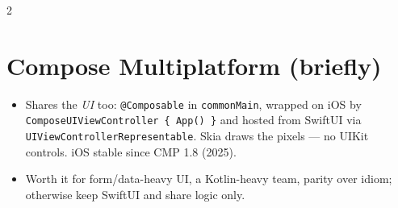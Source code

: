 \documentclass[8pt]{extarticle}
\begin{document}
\begin{multicols}{2}
\section{Compose Multiplatform (briefly)}
\begin{itemize}\raggedright
  \item Shares the \emph{UI} too: \texttt{@Composable} in \texttt{commonMain}, wrapped on
        iOS by \texttt{ComposeUIViewController \{ App() \}} and hosted from SwiftUI via
        \texttt{UIViewControllerRepresentable}. Skia draws the pixels — no UIKit controls.
        iOS stable since CMP 1.8 (2025).
  \item Worth it for form/data-heavy UI, a Kotlin-heavy team, parity over idiom; otherwise
        keep SwiftUI and share logic only.
\end{itemize}

\columnbreak


\end{multicols}
\end{document}
